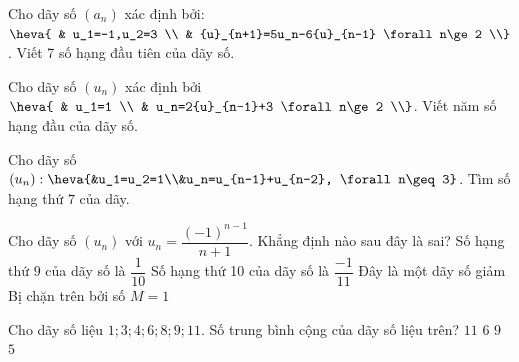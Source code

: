 \begin{ex}%
	Cho dãy số $(a_n)$  xác định bởi: $\heva{
	& u_1=-1,u_2=3 \\ 
	& {u}_{n+1}=5u_n-6{u}_{n-1} \forall n\ge 2 \\}$. Viết 7 số hạng đầu tiên của  dãy số.
\end{ex}

\begin{ex}%
	Cho  dãy số $(u_n)$ xác định bởi $\heva{
	 & u_1=1 \\
	& u_n=2{u}_{n-1}+3 \forall n\ge 2 \\}$. Viết năm số hạng đầu của  dãy số.
\end{ex}

\begin{ex}%
	Cho dãy số  $(u_n):\heva{&u_1=u_2=1\\&u_n=u_{n-1}+u_{n-2}, \forall n\geq 3}$. Tìm số hạng thứ $7$ của dãy.
\end{ex}

\begin{ex}%
	Cho dãy  số $( u_n)$ với $u_n=\dfrac{{{(-1)}^{n-1}}}{n+1}$. Khẳng định nào sau đây là sai?
	 \choice
		{Số hạng thứ $9$ của dãy số là  $\dfrac{1}{10}$}
		{Số hạng thứ 10 của dãy số là $\dfrac{-1}{11}$} 
		{\True Đây là một dãy số giảm} 
		{Bị chặn trên bởi số $M=1$} 
\end{ex}

\begin{ex}%
	Cho dãy số liệu $1; 3; 4; 6; 8; 9; 11$.  Số trung bình cộng của dãy số liệu trên?
	 \choice
		 {$ 11 $}
		{\True  $ 6 $ }
		{$ 9 $} 
		{$  5 $}
\end{ex}

